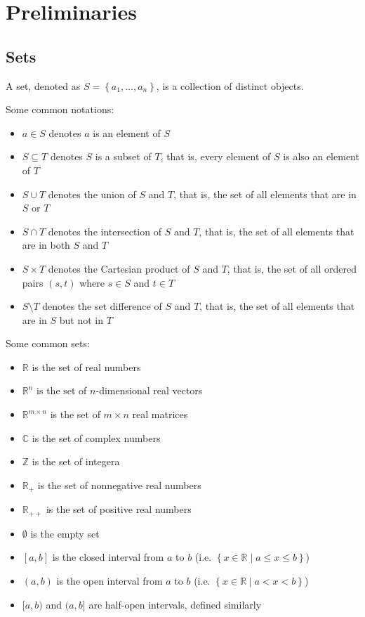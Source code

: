 \documentclass[11pt]{article}
\begin{document}
\newpage


\section{Preliminaries} 
\subsection{Sets}
A set, denoted as $S = \left\{ a_1, \ldots, a_n \right\}$, is a collection of distinct objects. \par
Some common notations: 
\begin{itemize}
    \item $a \in S$ denotes $a$ is an element of $S$
    \item $S \subseteq T$ denotes $S$ is a subset of $T$, that is, every element of $S$ is also an element of $T$
    \item $S \cup T$ denotes the union of $S$ and $T$, that is, the set of all elements that are in $S$ or $T$
    \item $S \cap T$ denotes the intersection of $S$ and $T$, that is, the set of all elements that are in both $S$ and $T$
    \item $S \times T$ denotes the Cartesian product of $S$ and $T$, that is, the set of all ordered pairs $(s, t)$ where $s \in S$ and $t \in T$
    \item $S \setminus T$ denotes the set difference of $S$ and $T$, that is, the set of all elements that are in $S$ but not in $T$
\end{itemize}  
Some common sets: 
\begin{itemize}
    \item $\mathbb{R}$ is the set of real numbers
    \item $\mathbb{R}^n$ is the set of $n$-dimensional real vectors
    \item $\mathbb{R}^{m\times n}$ is the set of $m \times n$ real matrices
    \item $\mathbb{C}$ is the set of complex numbers
    \item $\mathbb{Z}$ is the set of integera
    \item $\mathbb{R}_+$ is the set of nonnegative real numbers
    \item $\mathbb{R}_{++}$ is the set of positive real numbers
    \item $\emptyset$ is the empty set 
    \item $[a, b]$ is the closed interval from $a$ to $b$ (i.e. $\left\{ x \in \mathbb{R} \mid a \leq x \leq b \right\}$)
    \item $(a, b)$ is the open interval from $a$ to $b$ (i.e. $\left\{ x \in \mathbb{R} \mid a < x < b \right\}$)
    \item $[a, b)$ and $(a, b]$ are half-open intervals, defined similarly
\end{itemize}
\end{document}
